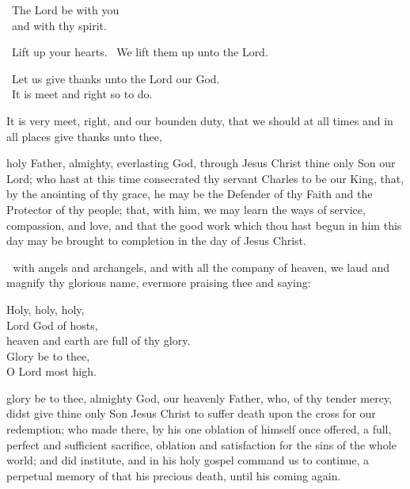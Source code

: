 {\vfill 



\vrscl\ The Lord be with you\\
\rspns\ and with thy spirit.


\vrscl\ Lift up your hearts.
\rspns\ We lift them up unto the Lord.

\vrscl\ Let us give thanks unto the Lord our God.\\
\rspns\ It is meet and right so to do.


It is very meet, right, and our bounden duty,
that we should at all times and in all places give thanks unto thee,

 holy Father,
almighty, everlasting God,
through Jesus Christ thine only Son our Lord;
who hast at this time consecrated thy servant Charles to be our King,
that, by the anointing of thy grace,
he may be the Defender of thy Faith
and the Protector of thy people;
that, with him, we may learn the ways
of service, compassion, and love,
and that the good work which thou hast begun in him this day
may be brought to completion
in the day of Jesus Christ.





 with angels and archangels,
and with all the company of heaven,
we laud and magnify thy glorious name,
evermore praising thee and saying:
\clearpage


\begin{center}
Holy, holy, holy,\\Lord God of hosts,\\
heaven and earth are full of thy glory.\\
Glory be to thee,\\O Lord most high.\end{center}
\vfill 




 glory be to thee,
almighty God, our heavenly Father,
who, of thy tender mercy,
didst give thine only Son Jesus Christ
to suffer death upon the cross for our redemption;
who made there,
by his one oblation of himself once offered,
a full, perfect and sufficient sacrifice, oblation and satisfaction
for the sins of the whole world;
and did institute,
and in his holy gospel command us to continue,
a perpetual memory of that his precious death,
until his coming again.


}
